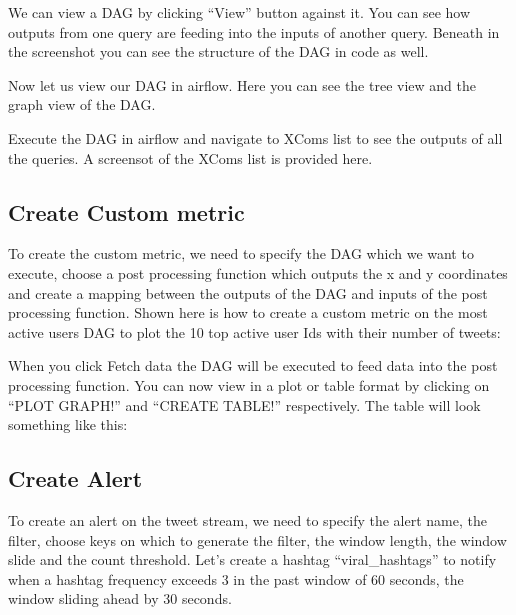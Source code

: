 \documentclass[letterpaper,10pt,english]{sphinxmanual}
\begin{document}
We can view a DAG by clicking “View” button against it. You can see how outputs from one query are feeding into the inputs of another query. Beneath in the screenshot you can see the structure of the DAG in code as well.

\noindent{}

Now let us view our DAG in airflow. Here you can see the tree view and the graph view of the DAG.

  

Execute the DAG in airflow and navigate to XComs list to see the outputs of all the queries. A screensot of the XComs list is provided here.

\noindent{}


\subsection{Create Custom metric}
\label{\detokenize{dashboard_website:create-custom-metric}}
To create the custom metric, we need to specify the DAG which we want to execute, choose a post processing function which outputs the x and y coordinates and create a mapping between the outputs of the DAG and inputs of the post processing function. Shown here is how to create a custom metric on the most active users DAG to plot the 10 top active user Ids with their number of tweets:

\noindent{}

When you click Fetch data the DAG will be executed to feed data into the post processing function. You can now view in a plot or table format by clicking on “PLOT GRAPH!” and “CREATE TABLE!” respectively. The table will look something like this:

\noindent{}


\subsection{Create Alert}
\label{\detokenize{dashboard_website:create-alert}}
To create an alert on the tweet stream, we need to specify the alert name, the filter, choose keys on which to generate the filter, the window length, the window slide and the count threshold. Let’s create a hashtag “viral\_hashtags” to notify when a hashtag frequency exceeds 3 in the past window of 60 seconds, the window sliding ahead by 30 seconds.
\end{document}
